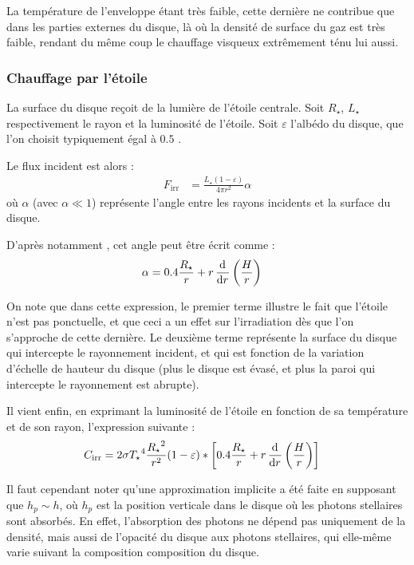La température de l'enveloppe étant très faible, cette dernière ne contribue que dans les parties externes du disque, là où la densité de surface du gaz est très faible, rendant du même coup le chauffage visqueux extrêmement ténu lui aussi.

\subsubsection{Chauffage par l'étoile}\label{sec:irradiation}
La surface du disque reçoit de la lumière de l'étoile centrale. Soit $R_\star$, $L_\star$ respectivement le rayon et la
luminosité de l'étoile. Soit $\varepsilon$ l'albédo du disque, que l'on choisit typiquement égal à $0.5$  \citep{menou2004low}. 

Le flux incident est alors \citep[eq. (7)]{menou2004low} : 
\begin{align}
F_\text{irr} &= \frac{L_\star(1-\varepsilon)}{4\pi r^2} \alpha
\end{align}
où $\alpha$ (avec $\alpha\ll 1$) représente l'angle entre les rayons incidents et la surface du disque. 

D'après notamment \cite[eq. (5)]{chiang1997spectral}, cet angle peut être écrit comme : 
\begin{align}
\alpha &= 0.4 \frac{R_\star}{r} + r \mathinner{ \dfrac{\operatorname{d \!}{^{}}}{\operatorname{d \!}{{r}^{}}} }\left(\frac{H}{r}\right)
\end{align}

On note que dans cette expression, le premier terme illustre le fait que l'étoile n'est pas ponctuelle, et que ceci a un effet sur l'irradiation dès que l'on s'approche de cette dernière. Le deuxième terme représente la surface du disque qui intercepte le rayonnement incident, et qui est fonction de la variation d'échelle de hauteur du disque (plus le disque est évasé, et plus la paroi qui intercepte le rayonnement est abrupte). 

Il vient enfin, en exprimant la luminosité de l'étoile en fonction de sa température et de son rayon, l'expression suivante :
\begin{align}
C_\text{irr} &= 2 \sigma {T_\star}^4 \frac{{R_\star}^2}{r^2} (1-\varepsilon) * \left[0.4 \frac{R_\star}{r} + r \mathinner{ \dfrac{\operatorname{d \!}{^{}}}{\operatorname{d \!}{{r}^{}}} }\left(\frac{H}{r}\right)\right]
\end{align}

Il faut cependant noter qu'une approximation implicite a été faite en supposant que $h_p\sim h$, où $h_p$ est la position
verticale dans le disque où les photons stellaires sont absorbés. En effet, l'absorption des photons ne dépend pas uniquement de
la densité, mais aussi de l'opacité du disque aux photons stellaires, qui elle-même varie suivant la composition
composition du disque.

